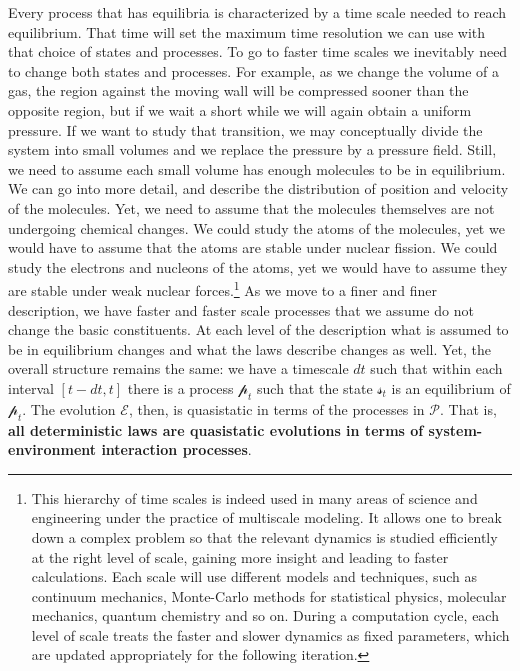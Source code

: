 \documentclass[11pt]{article}
\begin{document}
Every process that has equilibria is characterized by a time scale needed to reach equilibrium. That time will set the maximum time resolution we can use with that choice of states and processes. To go to faster time scales we inevitably need to change both states and processes. For example, as we change the volume of a gas, the region against the moving wall will be compressed sooner than the opposite region, but if we wait a short while we will again obtain a uniform pressure. If we want to study that transition, we may conceptually divide the system into small volumes and we replace the pressure by a pressure field. Still, we need to assume each small volume has enough molecules to be in equilibrium. We can go into more detail, and describe the distribution of position and velocity of the molecules. Yet, we need to assume that the molecules themselves are not undergoing chemical changes. We could study the atoms of the molecules, yet we would have to assume that the atoms are stable under nuclear fission. We could study the electrons and nucleons of the atoms, yet we would have to assume they are stable under weak nuclear forces.\footnote{This hierarchy of time scales is indeed used in many areas of science and engineering under the practice of multiscale modeling. \cite{Horstemeyer,Weinan} It allows one to break down a complex problem so that the relevant dynamics is studied efficiently at the right level of scale, gaining more insight and leading to faster calculations. Each scale will use different models and techniques, such as continuum mechanics, Monte-Carlo methods for statistical physics, molecular mechanics, quantum chemistry and so on. \cite{Brandt} During a computation cycle, each level of scale treats the faster and slower dynamics as fixed parameters, which are updated appropriately for the following iteration.} As we move to a finer and finer description, we have faster and faster scale processes that we assume do not change the basic constituents. At each level of the description what is assumed to be in equilibrium changes and what the laws describe changes as well. Yet, the overall structure remains the same: we have a timescale $dt$ such that within each interval $[t-dt, t]$ there is a process $\mathcal{p}_t$ such that the state $\mathcal{s}_t$ is an equilibrium of $\mathcal{p}_t$. The evolution $\mathcal{E}$, then, is quasistatic in terms of the processes in $\mathcal{P}$. That is, \textbf{all deterministic laws are quasistatic evolutions in terms of system-environment interaction processes}.
\end{document}
